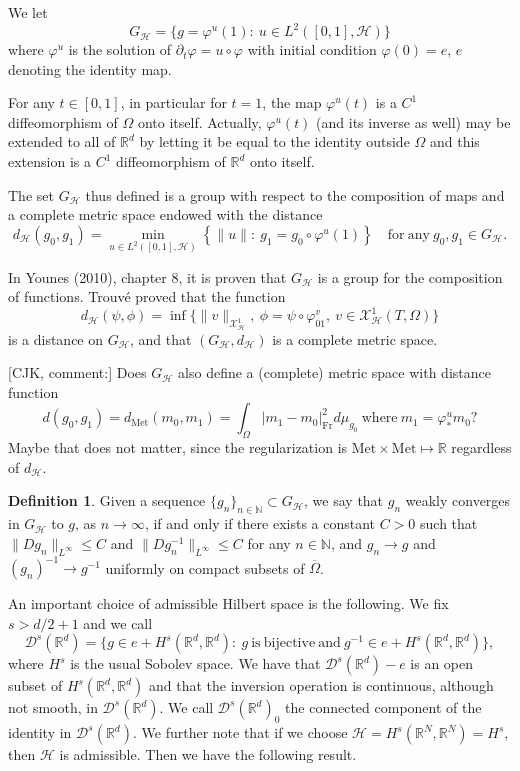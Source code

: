 \documentclass{article}
\theoremstyle{plain}
\theoremstyle{definition}
\newtheorem{defin}[teo]{Definition}
\numberwithin{equation}{section}
\begin{document}
We let
\begin{equation}
G_{\mathcal{H}}=\{g=\varphi^u(1):\ 
u\in L^2([0,1],\mathcal{H})\}
\end{equation}
where $\varphi^u$ is the solution of $\partial_t\varphi=u\circ\varphi$ with initial condition $\varphi(0)=e$,  $e$ denoting the identity map.

For any $t\in[0,1]$, in particular for $t=1$, the map $\varphi^u(t)$ is a $C^1$ diffeomorphism of $\Omega$ onto itself. Actually, $\varphi^u(t)$ (and its inverse as well) may be extended to all of $\mathbb{R}^d$ by letting it be equal to the identity outside $\Omega$ and this extension is a $C^1$ diffeomorphism of $\mathbb{R}^d$ onto itself.

The set $G_{\mathcal{H}}$ thus defined is a group with respect to the composition of maps and a complete metric space endowed with the distance
$$d_{\mathcal{H}}(g_0,g_1)=\min_{u\in L^2([0,1],\mathcal{H})}\left\{\|u\|:\ g_1=g_0\circ\varphi^u(1)
\right\}\quad\mathrm{for\ any\ }g_0,g_1\in
G_{\mathcal{H}}.$$

In Younes (2010), chapter 8, it is proven that $G_\mathcal{H}$ is a group for the composition of functions. Trouvé proved that
the function
\[
d_\mathcal{H}(\psi,\phi)=\inf\{\|v\|_{\mathcal{X}_\mathcal{H}^1},\ \phi=\psi\circ\varphi_{01}^v,\ v\in \mathcal{X}_\mathcal{H}^1(T,\Omega)\}
\]
is  a  distance  on $G_\mathcal{H}$, and that $(G_\mathcal{H},d_\mathcal{H})$ is a complete metric space.

[CJK, comment:] Does $G_{\mathcal{H}}$ also define a (complete) metric space with distance function
\[
d(g_0,g_1)=d_\mathrm{Met}(m_0,m_1) = \int_\Omega |m_1-m_0|_\mathrm{Fr}^2 d \mu_{g_0}\ \mathrm{where}\ m_1=\varphi^u_*m_0?
\]
Maybe that does not matter, since the regularization is $\mathrm{Met}\times\mathrm{Met}\mapsto \mathbb{R}$ regardless of $d_{\mathcal{H}}$.

\begin{defin}\label{weakconv}
	Given a sequence $\{g_n\}_{n\in\mathbb{N}}\subset G_{\mathcal{H}}$, we say that $g_n$ weakly converges in $G_{\mathcal{H}}$ to $g$, as $n\to \infty$, if and only if there exists a constant $C>0$ such that 
	$\|Dg_n\|_{L^{\infty}}\leq C$ and $\|Dg^{-1}_n\|_{L^{\infty}}\leq C$ for any $n\in\mathbb{N}$, and
	$g_n\to g$ and $(g_n)^{-1}\to g^{-1}$ uniformly on compact subsets of $\overline{\Omega}$.
\end{defin} 

An important choice of admissible Hilbert space is the following.
We fix $s>d/2+1$ and we call
\[
\mathcal{D}^s(\mathbb{R}^d)=\{g\in e+H^s(\mathbb{R}^d,\mathbb{R}^d):\
g\mathrm{\ is\ bijective\ and\ }g^{-1}\in e+H^s(\mathbb{R}^d,\mathbb{R}^d)\},
\]
where $H^s$ is the usual Sobolev space. We have that $\mathcal{D}^s(\mathbb{R}^d)-e$
is an open subset of $H^s(\mathbb{R}^d,\mathbb{R}^d)$
and that the inversion operation is continuous, although not smooth, in $\mathcal{D}^s(\mathbb{R}^d)$.
We call $\mathcal{D}^s(\mathbb{R}^d)_0$ the connected component of the identity in $\mathcal{D}^s(\mathbb{R}^d)$. We further note that if we choose $\mathcal{H}=H^s(\mathbb{R}^N,\mathbb{R}^N)=H^s$, then $\mathcal{H}$ is admissible. 
Then we have the following result.
\end{document}
